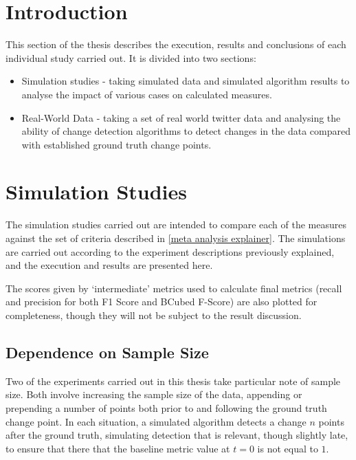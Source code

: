 \documentclass[../main.tex]{subfiles}
\begin{document}
\section{Introduction}

This section of the thesis describes the execution, results and conclusions of each individual study carried out. It is divided into two sections:

\begin{itemize}
    \item Simulation studies - taking simulated data and simulated algorithm results to analyse the impact of various cases on calculated measures.
    \item Real-World Data - taking a set of real world twitter data and analysing the ability of change detection algorithms to detect changes in the data compared with established ground truth change points.
\end{itemize}

\section{Simulation Studies}

The simulation studies carried out are intended to compare each of the measures against the set of criteria described in \autoref{meta analysis explainer}. The simulations are carried out according to the experiment descriptions previously explained, and the execution and results are presented here.

The scores given by `intermediate' metrics used to calculate final metrics (recall and precision for both F1 Score and BCubed F-Score) are also plotted for completeness, though they will not be subject to the result discussion.

\subsection{Dependence on Sample Size}
\label{sample size dependence}

Two of the experiments carried out in this thesis take particular note of sample size. Both involve increasing the sample size of the data, appending or prepending a number of points both prior to and following the ground truth change point. In each situation, a simulated algorithm detects a change $n$ points after the ground truth, simulating detection that is relevant, though slightly late, to ensure that there that the baseline metric value at $t = 0$ is not equal to $1$.
\end{document}
